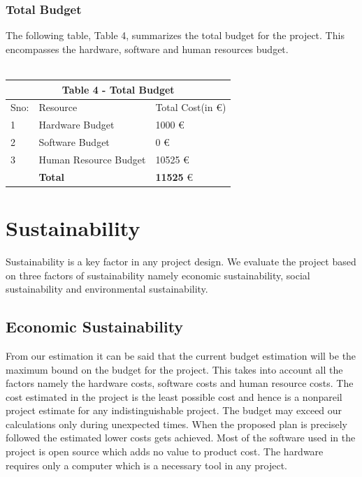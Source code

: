 \subsubsection{Total Budget}
The following table, Table 4, summarizes the total budget for the project. This encompasses the
hardware, software and human resources budget.
\\ \\ 
\begin{table}[H]
\centering
\begin{tabular}{|p{1cm}||p{4cm}|p{3cm}|}
 \hline
 \multicolumn{3}{|c|}{Table 4 - Total Budget} \\
 \hline
 Sno: &Resource &Total Cost(in \euro) \\
 \hline
 1   & Hardware Budget  & 1000 \euro \\
 2   & Software Budget  & 0 \euro \\
 3   & Human Resource Budget  & 10525 \euro \\
 \hline
\hline
   & \textbf{Total}  & \textbf{11525} \euro \\
 \hline
 
 

\end{tabular}

\end{table}
\section{Sustainability}
Sustainability is a key factor in any project design. We evaluate the project based on three
factors of sustainability namely economic sustainability, social sustainability and environmental
sustainability.
\subsection{Economic Sustainability}
 From our estimation it can be said that the current budget estimation will be the
maximum bound on the budget for the project. This takes into account all the factors namely
the hardware costs, software costs and human resource costs. The cost estimated in the project is the least possible cost and hence is a nonpareil project estimate for any indistinguishable project. The budget
may exceed our calculations only during unexpected times. When the proposed plan is precisely followed the estimated lower costs gets achieved. 
  Most of the software used in the project is open source which adds no value to product cost. The hardware requires only a computer which is a necessary tool in any project.


